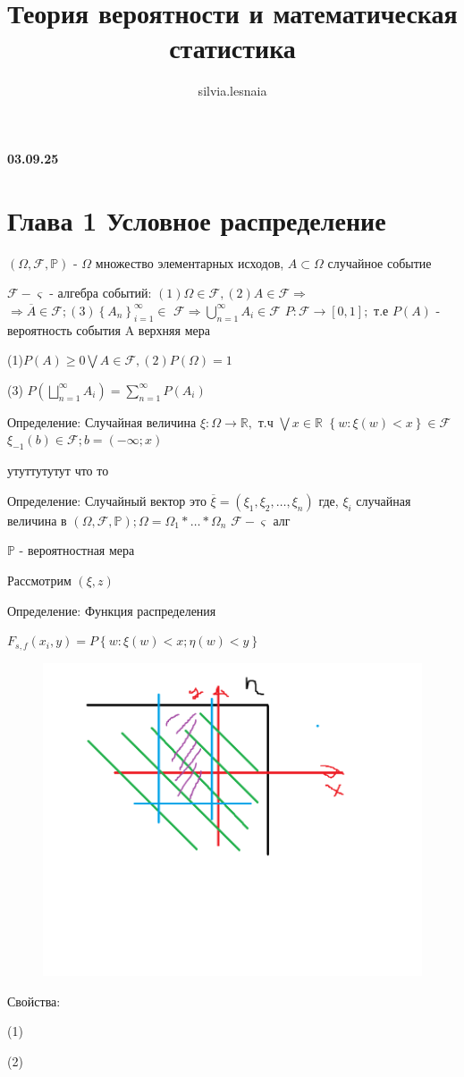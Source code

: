 \documentclass{article}
\title{Теория вероятности и математическая статистика}
\author{silvia.lesnaia }
\begin{document}
\maketitle

\textbf{03.09.25}

\section{Глава 1 Условное распределение}


$(\Omega, \mathcal{F}, \mathbb{P}   )$ - $\Omega $ множество элементарных исходов,
$A\subset \Omega $ случайное событие 

$\mathcal{F} - \varsigma $ - алгебра событий: $(1)\Omega \in \mathcal{F},(2) A \in \mathcal{F}\Rightarrow $
$\Rightarrow \overline{A} \in \mathcal{F}; (3)\left\{ A_n\right\}_{i=1}^\infty  \in$
$\mathcal{F}\Rightarrow \bigcup _{n = 1}^{\infty} A_i \in \mathcal{F}$
$P:\mathcal{F}\rightarrow \left[0,1\right];$ т.е $P(A)$ - вероятность события A верхняя мера


(1)$P(A)\geq 0 \bigvee A \in \mathcal{F}, (2) P(\Omega) = 1$

(3) $P(\bigsqcup _{n = 1}^{\infty} A_i )= \sum_{n = 1}^{\infty} P(A_i) $

Определение: Случайная величина $\xi : \Omega \rightarrow \mathbb{R}, $ т.ч
$\bigvee x \in \mathbb{R}$ $\left\{w: \xi(w)<x \right\} \in \mathcal{F}$
$\xi_{-1}(b)  \in \mathcal{F}; b=(- \infty; x)$ 

утуттутутут
что то 



Определение: Случайный вектор это $\overline{\xi} = (\xi_1,\xi_2, \dots, \xi_n)$
где, $\xi_i$ случайная величина в $(\Omega, \mathcal{F}, \mathbb{P}); \Omega=\Omega_1* \dots *\Omega_n$
$\mathcal{F} -\varsigma $ алг

$\mathbb{P}$ - вероятностная мера

Рассмотрим $(\xi, z)$

Определение: Функция распределения

$F_{s,f} (x_i,y) = P\left\{w : \xi (w) < x ; \eta (w) < y \right\} $

\begin{figure} [H]
    \includegraphics[width=0.50\linewidth]{Без имени.png}
\end{figure}

Свойства:

(1)

(2)
\end{document}

